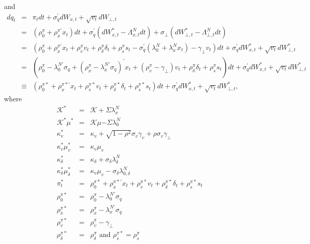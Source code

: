\documentclass{article}
\begin{document}
and%
\begin{eqnarray*}
dq_{t} &=&\pi _{t}dt+\sigma _{q}^{\prime }dW_{x,t}+\sqrt{v_{t}}dW_{\bot ,t}
\\
&=&\left( \rho _{0}^{\pi }+\rho _{x}^{\pi \prime }x_{t}\right) dt+\sigma
_{q}^{\prime }\left( dW_{x,t}^{\ast }-\Lambda _{x,t}^{N}dt\right) +\sigma
_{\bot }\left( dW_{\bot ,t}^{\ast }-\Lambda _{\bot ,t}^{N}dt\right)  \\
&=&\left( \rho _{0}^{\pi }+\rho _{x}^{\pi \prime }x_{t}+\rho _{v}^{\pi
}v_{t}+\rho _{\delta }^{\pi }\delta _{t}+\rho _{s}^{\pi }s_{t}-\sigma
_{q}^{\prime }\left( \lambda _{0}^{N}+\lambda _{x}^{N}x_{t}\right) -\gamma
_{\bot }v_{t}\right) dt+\sigma _{q}^{\prime }dW_{x,t}^{\ast }+\sqrt{v_{t}}%
dW_{\bot ,t}^{\ast } \\
&=&\left( \rho _{0}^{\pi }-\lambda _{0}^{N\prime }\sigma _{q}+\left( \rho
_{x}^{\pi }-\lambda _{x}^{N\prime }\sigma _{q}\right) ^{\prime }x_{t}+\left(
\rho _{v}^{\pi }-\gamma _{\bot }\right) v_{t}+\rho _{\delta }^{\pi }\delta
_{t}+\rho _{s}^{\pi }s_{t}\right) dt+\sigma _{q}^{\prime }dW_{x,t}^{\ast }+%
\sqrt{v_{t}}dW_{\bot ,t}^{\ast } \\
&\equiv &\left( \rho _{0}^{\pi \ast }+\rho _{x}^{\pi \ast \prime }x_{t}+\rho
_{v}^{\pi \ast }v_{t}+\rho _{\delta }^{\pi \ast }\delta _{t}+\rho _{s}^{\pi
\ast }s_{t}\right) dt+\sigma _{q}^{\prime }dW_{x,t}^{\ast }+\sqrt{v_{t}}%
dW_{\bot ,t}^{\ast },
\end{eqnarray*}%
where 
\begin{eqnarray*}
\mathcal{K}^{\ast } &=&\mathcal{K+}\Sigma \lambda _{x}^{N} \\
\mathcal{K}^{\ast }\mu ^{\ast } &=&\mathcal{K}\mu \mathcal{-}\Sigma \lambda
_{0}^{N} \\
\kappa _{v}^{\ast } &=&\kappa _{v}+\sqrt{1-\rho ^{2}}\sigma _{v}\gamma
_{v}+\rho \sigma _{v}\gamma _{\bot } \\
\kappa _{v}^{\ast }\mu _{v}^{\ast } &=&\kappa _{v}\mu _{v} \\
\kappa _{\delta }^{\ast } &=&\kappa _{\delta }+\sigma _{\delta }\lambda
_{\delta }^{N} \\
\kappa _{\delta }^{\ast }\mu _{\delta }^{\ast } &=&\kappa _{v}\mu
_{v}-\sigma _{\delta }\lambda _{0,\delta }^{N} \\
\pi _{t}^{\ast } &=&\rho _{0}^{\pi \ast }+\rho _{x}^{\pi \ast \prime
}x_{t}+\rho _{v}^{\pi \ast }v_{t}+\rho _{\delta }^{\pi \ast }\delta
_{t}+\rho _{s}^{\pi \ast }s_{t} \\
\rho _{0}^{\pi \ast } &=&\rho _{0}^{\pi }-\lambda _{0}^{N\prime }\sigma _{q}
\\
\rho _{x}^{\pi \ast } &=&\rho _{x}^{\pi }-\lambda _{x}^{N\prime }\sigma _{q}
\\
\rho _{v}^{\pi \ast } &=&\rho _{v}^{\pi }-\gamma _{\bot } \\
\rho _{\delta }^{\pi \ast } &=&\rho _{\delta }^{\pi }\text{ and }\rho
_{s}^{\pi \ast }=\rho _{s}^{\pi }
\end{eqnarray*}
\end{document}
